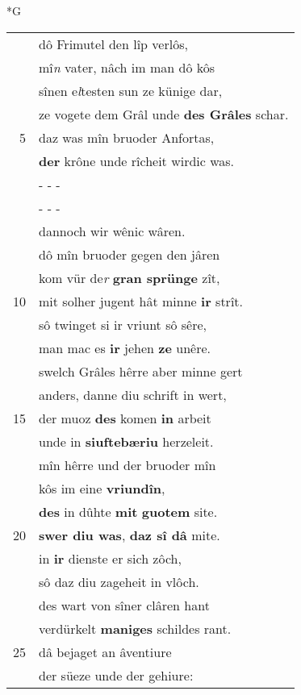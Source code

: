 \documentclass[8pt,a4paper,notitlepage]{article}
\begin{document}
\newpage
\begin{table}[ht]
\begin{minipage}[t]{0.5\linewidth}
\small
\begin{center}*G
\end{center}
\begin{tabular}{rl}
 & dô Frimutel den lîp verlôs,\\ 
 & mî\textit{n} vater, nâch im man dô kôs\\ 
 & sînen e\textit{l}testen sun ze künige dar,\\ 
 & ze vogete dem Grâl unde \textbf{des Grâles} schar.\\ 
5 & daz was mîn bruoder Anfortas,\\ 
 & \textbf{der} krône unde rîcheit wirdic was.\\ 
 & \multicolumn{1}{l}{ - - - }\\ 
 & \multicolumn{1}{l}{ - - - }\\ 
 & dannoch wir wênic wâren.\\ 
 & dô mîn bruoder gegen den jâren\\ 
 & kom vür de\textit{r} \textbf{gran sprünge} zît,\\ 
10 & mit solher jugent hât minne \textbf{ir} strît.\\ 
 & sô twinget si ir vriunt sô sêre,\\ 
 & man mac es \textbf{ir} jehen \textbf{ze} unêre.\\ 
 & swelch Grâles hêrre aber minne gert\\ 
 & anders, danne diu schrift in wert,\\ 
15 & der muoz \textbf{des} komen \textbf{in} arbeit\\ 
 & unde in \textbf{siuftebæriu} herzeleit.\\ 
 & mîn hêrre und der bruoder mîn\\ 
 & kôs im eine \textbf{vriundîn},\\ 
 & \textbf{des} in dûhte \textbf{mit} \textbf{guotem} site.\\ 
20 & \textbf{swer diu was}, \textbf{daz sî dâ} mite.\\ 
 & in \textbf{ir} dienste er sich zôch,\\ 
 & sô daz diu zageheit in vlôch.\\ 
 & des wart von sîner clâren hant\\ 
 & verdürkelt \textbf{maniges} schildes rant.\\ 
25 & dâ bejaget an âventiure\\ 
 & der süeze unde der gehiure:\\ 

\end{tabular}
\end{minipage}
\end{table}
\end{document}
